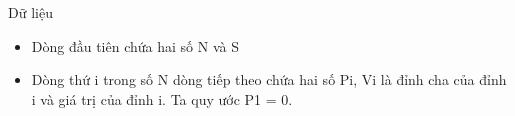 Dữ liệu
\begin{itemize}
	\item     Dòng đầu tiên chứa hai số N và S   
	\item     Dòng thứ i trong số N dòng tiếp theo chứa hai số Pi, Vi là đỉnh cha của đỉnh i và giá trị của đỉnh i. Ta quy ước P1 = 0.   
\end{itemize}